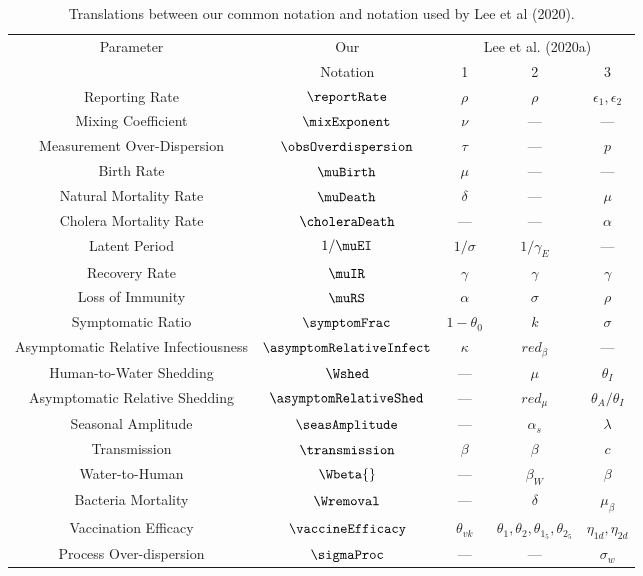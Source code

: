 \begin{table}
  \begin{center}
  \begin{tabular}{|c|c|c|c|c|}\hline
    \multirow{2}{*}{Parameter} & Our & \multicolumn{3}{c|}{Lee et al. (2020a)} \\\cline{3-5}
     & Notation & 1 & 2 & 3 \\
    \hline
    \hline
    Reporting Rate & $\reportRate$ & $\rho$ & $\rho$ & $\epsilon_1, \epsilon_2$ \\\hline
    Mixing Coefficient & $\mixExponent$ & $\nu$ & --- & --- \\\hline
    Measurement Over-Dispersion & $\obsOverdispersion$ & $\tau$ & --- & $p$ \\\hline
    Birth Rate & $\muBirth$ & $\mu$ & --- & --- \\\hline
    Natural Mortality Rate & $\muDeath$ & $\delta$ & --- & $\mu$ \\\hline
    Cholera Mortality Rate & $\choleraDeath$ & --- & --- & $\alpha$ \\\hline
    Latent Period & $1/\muEI$ & $1/\sigma$ & $1/\gamma_E$ & --- \\\hline
    Recovery Rate & $\muIR$ & $\gamma$ & $\gamma$ & $\gamma$ \\\hline
    Loss of Immunity & $\muRS$ & $\alpha$ & $\sigma$ & $\rho$ \\\hline
    Symptomatic Ratio & $\symptomFrac$ & $1 - \theta_0$ & $k$ & $\sigma$ \\\hline
    Asymptomatic Relative Infectiousness & $\asymptomRelativeInfect$ & $\kappa$ & $red_\beta$ & --- \\\hline
    Human-to-Water Shedding & $\Wshed$ & --- & $\mu$ & $\theta_I$ \\\hline
    Asymptomatic Relative Shedding & $\asymptomRelativeShed$ & --- & $red_\mu$ & $\theta_A/\theta_I$ \\\hline
    Seasonal Amplitude & $\seasAmplitude$ & --- & $\alpha_s$ & $\lambda$ \\\hline
    Transmission & $\transmission$ & $\beta$ & $\beta$ & $c$ \\\hline
    Water-to-Human & $\Wbeta{}$ & --- & $\beta_W$ & $\beta$ \\\hline
    Bacteria Mortality & $\Wremoval$ & --- & $\delta$ & $\mu_\beta$ \\\hline
    Vaccination Efficacy & $\vaccineEfficacy$ & $\theta_{vk}$ & $\theta_1, \theta_2, \theta_{1_5}, \theta_{2_5}$ & $\eta_{1d}, \eta_{2d}$ \\\hline
    Process Over-dispersion & $\sigmaProc$ & --- & --- & $\sigma_w$\\\hline
  \end{tabular}
  \end{center}
  \caption{\label{tab:translate}Translations between our common notation and notation used by Lee et al (2020).}
\end{table}
